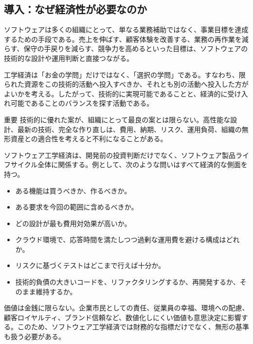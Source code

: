 \subsection{導入：なぜ経済性が必要なのか}

ソフトウェアは多くの組織にとって、単なる業務補助ではなく、事業目標を達成するための手段である。売上を伸ばす、顧客体験を改善する、業務の再作業を減らす、保守の手戻りを減らす、競争力を高めるといった目標は、ソフトウェアの技術的な設計や運用判断と直接つながる。

工学経済は「お金の学問」だけではなく、「選択の学問」である。すなわち、限られた資源をこの技術的活動へ投入すべきか、それとも別の活動へ投入した方がよいかを考える。したがって、技術的に実現可能であることと、経済的に受け入れ可能であることのバランスを探す活動である。

\begin{pointbox}{重要}
技術的に優れた案が、組織にとって最良の案とは限らない。高性能な設計、最新の技術、完全な作り直しは、費用、納期、リスク、運用負荷、組織の無形資産との適合性を考えると不利になることがある。
\end{pointbox}

ソフトウェア工学経済は、開発前の投資判断だけでなく、ソフトウェア製品ライフサイクル全体に関係する。例として、次のような問いはすべて経済的な側面を持つ。
\begin{itemize}
  \item ある機能は買うべきか、作るべきか。
  \item ある要求を今回の範囲に含めるべきか。
  \item どの設計が最も費用対効果が高いか。
  \item クラウド環境で、応答時間を満たしつつ過剰な運用費を避ける構成はどれか。
  \item リスクに基づくテストはどこまで行えば十分か。
  \item 技術的負債の大きいコードを、リファクタリングするか、再開発するか、そのまま維持するか。
\end{itemize}

価値は金銭に限らない。企業市民としての責任、従業員の幸福、環境への配慮、顧客ロイヤルティ、ブランド信頼など、数値化しにくい価値も意思決定に影響する。このため、ソフトウェア工学経済では財務的な指標だけでなく、無形の基準も扱う必要がある。

